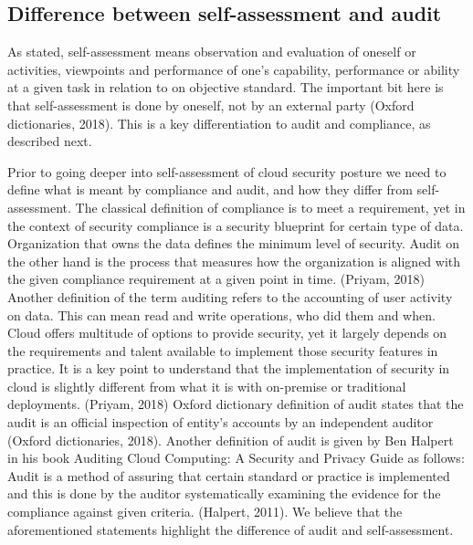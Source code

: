 \documentclass{article}
\begin{document}
\subsection{Difference between self-assessment and audit}
As stated, self-assessment means observation and evaluation of oneself or activities, viewpoints and performance of one's capability, performance or ability at a given task in relation to on objective standard. The important bit here is that self-assessment is done by oneself, not by an external party (Oxford dictionaries, 2018). This is a key differentiation to audit and compliance, as described next.
\par
Prior to going deeper into self-assessment of cloud security posture we need to define what is meant by compliance and audit, and how they differ from self-assessment.
The classical definition of compliance is to meet a requirement, yet in the context of security compliance is a security blueprint for certain type of data. Organization that owns the data defines the minimum level of security.
Audit on the other hand is the process that measures how the organization is aligned with the given compliance requirement at a given point in time. (Priyam, 2018)
Another definition of the term auditing refers to the accounting of user activity on data. This can mean read and write operations, who did them and when.
Cloud offers multitude of options to provide security, yet it largely depends on the requirements and talent available to implement those security features in practice. It is a key point to understand that the implementation of security in cloud is slightly different from what it is with on-premise or traditional deployments. (Priyam, 2018)
Oxford dictionary definition of audit states that the audit is an official inspection of entity's accounts by an independent auditor (Oxford dictionaries, 2018). Another definition of audit is given by Ben Halpert in his book Auditing Cloud Computing: A Security and Privacy Guide as follows: Audit is a method of assuring that certain standard or practice is implemented and this is done by the auditor systematically examining the evidence for the compliance against given criteria. (Halpert, 2011). We believe that the aforementioned statements highlight the difference of audit and self-assessment. 
\end{document}
